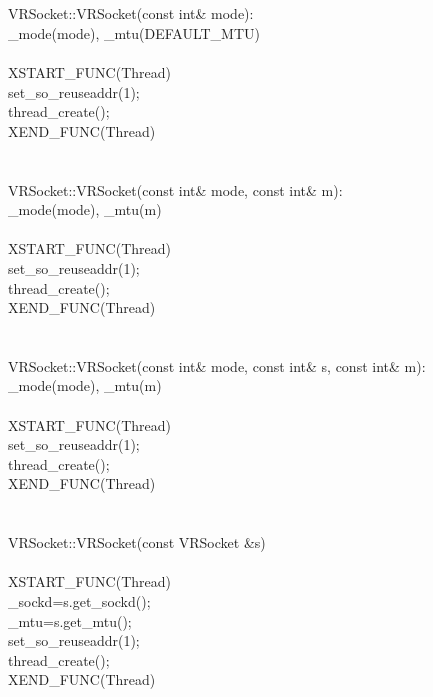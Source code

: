 \documentclass{article}
\begin{document}
\\
 
\\
 VRSocket::VRSocket(const int& mode):
\\
 _mode(mode), _mtu(DEFAULT_MTU)
\\
 {
\\
         XSTART_FUNC(Thread)
\\
         set_so_reuseaddr(1);
\\
         thread_create();
\\
         XEND_FUNC(Thread)
\\
 }
\\
 
\\
 VRSocket::VRSocket(const int& mode, const int& m):
\\
 _mode(mode), _mtu(m)
\\
 {
\\
         XSTART_FUNC(Thread)
\\
         set_so_reuseaddr(1);
\\
         thread_create();
\\
         XEND_FUNC(Thread)
\\
 }
\\
 
\\
 VRSocket::VRSocket(const int& mode, const int& s, const int& m):
\\
 _mode(mode), _mtu(m)
\\
 {
\\
         XSTART_FUNC(Thread)
\\
         set_so_reuseaddr(1);
\\
         thread_create();
\\
         XEND_FUNC(Thread)
\\
 }
\\
 
\\
 VRSocket::VRSocket(const VRSocket &s)
\\
 {
\\
         XSTART_FUNC(Thread)
\\
     _sockd=s.get_sockd();
\\
         _mtu=s.get_mtu();
\\
         set_so_reuseaddr(1);
\\
         thread_create();
\\
         XEND_FUNC(Thread)
\\
 }
\end{document}
